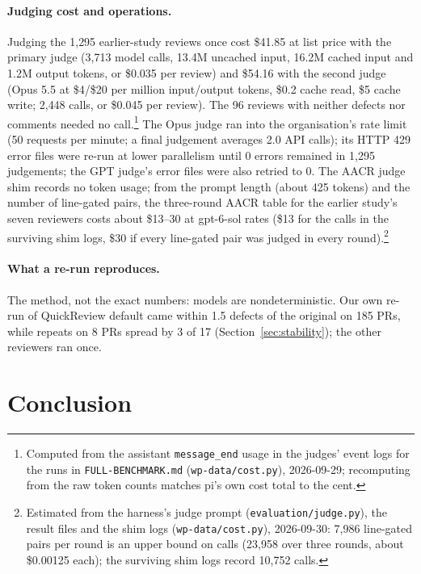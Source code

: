 \documentclass[11pt,a4paper]{article}
\newcommand{\qcr}{QuickReview}
\newcommand{\code}[1]{\texttt{#1}}
\begin{document}
\paragraph{Judging cost and operations.} Judging the 1{,}295 earlier-study
reviews once cost \$41.85 at list price with the primary judge (3{,}713 model
calls, 13.4M uncached input, 16.2M cached input and 1.2M output tokens, or
\$0.035 per review) and \$54.16 with the second judge (Opus 5.5 at \$4/\$20 per
million input/output tokens, \$0.2 cache read, \$5 cache write; 2{,}448 calls,
or \$0.045 per review). The 96 reviews with neither defects nor comments
needed no call.\footnote{Computed from the assistant \code{message\_end} usage
in the judges' event logs for the runs in \code{FULL-BENCHMARK.md}
(\code{wp-data/cost.py}), 2026-09-29; recomputing from the raw token counts
matches pi's own cost total to the cent.} The Opus judge ran into the
organisation's rate limit (50 requests per minute; a final judgement averages 2.0 API
calls); its HTTP 429 error files were re-run at lower parallelism until
0 errors remained in 1{,}295 judgements; the GPT judge's error files were
also retried to 0. The AACR judge shim records no token usage; from the prompt
length (about 425 tokens) and the number of line-gated pairs, the
three-round AACR table for the earlier study's seven reviewers costs about
\$13--30 at gpt-6-sol rates (\$13 for the calls in the surviving shim logs,
\$30 if every line-gated pair was judged in every round).\footnote{Estimated from the harness's judge
prompt (\code{evaluation/judge.py}), the result files and the shim logs
(\code{wp-data/cost.py}), 2026-09-30: 7{,}986 line-gated pairs per round is an
upper bound on calls (23{,}958 over three rounds, about \$0.00125 each); the
surviving shim logs record 10{,}752 calls.}

\paragraph{What a re-run reproduces.} The method, not the exact numbers:
models are nondeterministic. Our own re-run of \qcr{} default came within 1.5
defects of the original on 185 PRs, while repeats on 8 PRs spread by 3 of 17
(Section~\ref{sec:stability}); the other reviewers ran once.

\section{Conclusion}
\label{sec:conclusion}
\end{document}
